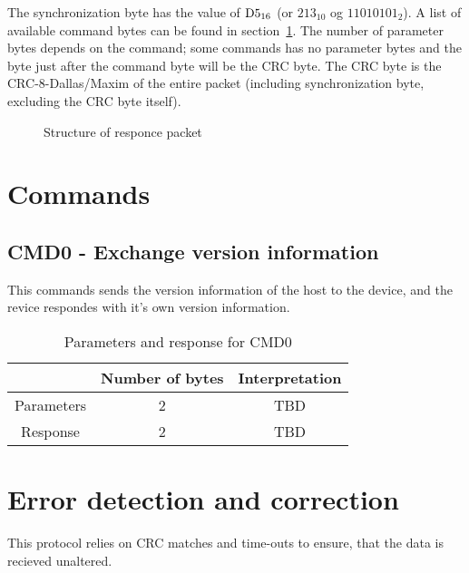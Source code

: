 \documentclass[11pt,a4paper,oneside]{memoir}
\begin{document}
The synchronization byte has the value of $\textup{D}5_{16}$ (or
$213_{10}$ og $11010101_2$). A list of available command bytes can be
found in section~\ref{sc:commands}. The number of parameter bytes
depends on the command; some commands has no parameter bytes and the
byte just after the command byte will be the CRC byte. The CRC byte is
the CRC-8-Dallas/Maxim of the entire packet (including synchronization
byte, excluding the CRC byte itself).


\begin{figure}[htbp]
  \centering
  \vspace{2cm}
  \caption{Structure of responce packet}
  \label{fig:response-packet}
\end{figure}


\section{Commands}
\label{sc:commands}

\subsection{CMD0 - Exchange version information}

This commands sends the version information of the host to the device,
and the revice respondes with it's own version information.

\begin{table}[htbp]
  \centering
  \begin{tabular}{ccc}
    \toprule
    & \textbf{Number of bytes} & \textbf{Interpretation} \\
    \midrule
    Parameters & 2 & TBD \\
    Response & 2 & TBD \\
    \bottomrule
  \end{tabular}
  \caption{Parameters and response for CMD0}
  \label{tab:cmd0}
\end{table}


\section{Error detection and correction}

This protocol relies on CRC matches and time-outs to ensure, that the
data is recieved unaltered.
\end{document}
